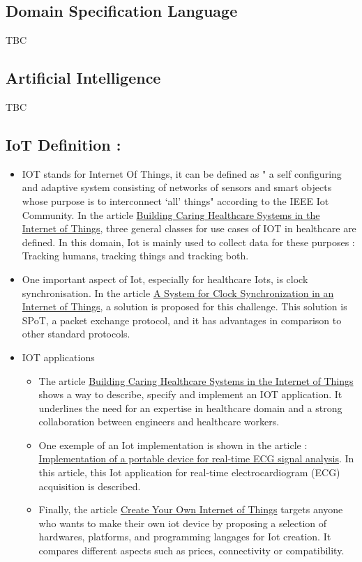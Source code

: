 \subsection{Domain Specification Language}
TBC

\subsection{Artificial Intelligence} 
TBC

\subsection{IoT Definition : }
  \begin{itemize}
  
      \item IOT stands for Internet Of Things, it can be defined as " a self configuring and adaptive system consisting of networks of sensors and smart objects whose purpose is to interconnect ‘all’ things" according to the IEEE Iot Community. In the article \uline{Building Caring Healthcare Systems in the Internet of Things}, three general classes for use cases of IOT in healthcare are defined. In this domain, Iot is mainly used to collect data for these purposes : Tracking humans, tracking things and tracking both.

      \item One important aspect of Iot, especially for healthcare Iots, is clock synchronisation. In the article \uline{A System for Clock Synchronization in an Internet of Things}, a solution is proposed for this challenge. This solution is SPoT, a packet exchange protocol, and it has advantages in comparison to other standard protocols.

      \item IOT applications\newline
      \begin{itemize}
        \item The article \uline{Building Caring Healthcare Systems
        in the Internet of Things} shows a way to describe, specify and implement an IOT application. It underlines the need for an expertise in healthcare domain and         a strong collaboration between engineers and healthcare workers.
        \item One exemple of an Iot implementation is shown in the article : \uline{Implementation of a portable device for real-time ECG signal analysis}. In this             article, this Iot application for real-time
        electrocardiogram (ECG) acquisition is described.
        \item Finally, the article \uline{Create Your Own Internet of Things} targets anyone who wants to make their own iot device by proposing a selection of           hardwares, platforms, and programming langages for Iot creation. It compares different aspects such as prices, connectivity or compatibility.
      \end{itemize}
  \end{itemize}
